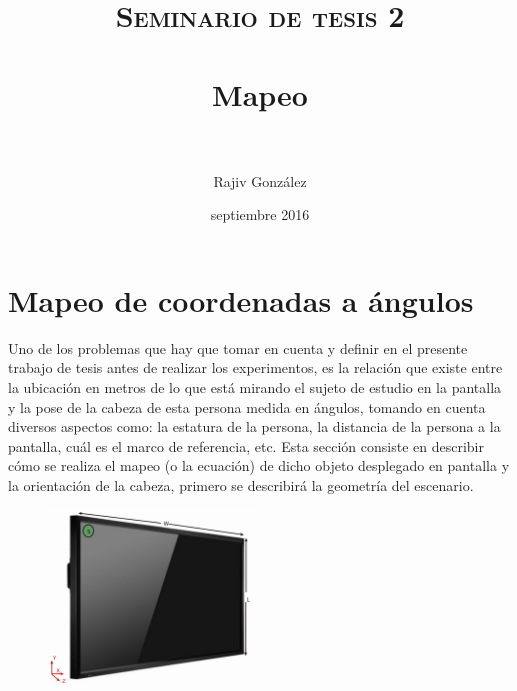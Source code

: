 \documentclass[paper=a4, fontsize=11pt]{scrartcl} %
\title{	
\normalfont \normalsize 
\textsc{Seminario de tesis 2} \\ [25pt] %
\horrule{0.5pt} \\[0.4cm] %
\huge Mapeo\\ %
\horrule{2pt} \\[0.5cm] %
}
\author{Rajiv González} %
\date{septiembre 2016}
\numberwithin{equation}{section} %
\numberwithin{figure}{section} %
\numberwithin{table}{section} %
\begin{document}
\maketitle %




\section{Mapeo de coordenadas a ángulos}
Uno de los problemas que hay que tomar en cuenta y definir en el presente trabajo de tesis antes de realizar los experimentos, es la relación que existe entre la ubicación en metros de lo que está mirando el sujeto de estudio en la pantalla y la pose de la cabeza de esta persona medida en ángulos, tomando en cuenta diversos aspectos como: la estatura de la persona, la distancia de la persona a la pantalla, cuál es el marco de referencia, etc. Esta sección consiste en describir cómo se realiza el mapeo (o la ecuación) de dicho objeto desplegado en pantalla y la orientación de la cabeza, primero se describirá la geometría del escenario. 
\begin{figure}[htbp]
\centering
\includegraphics[width=0.5\textwidth]{pantalla2}
\caption{}\label{fig: figura}
\end{figure}
\end{document}
